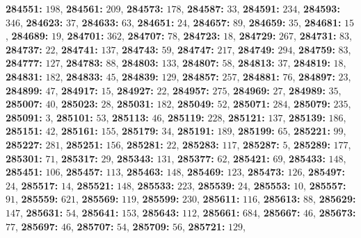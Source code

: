 \textsf{\bfseries 284551:} $198$, \textsf{\bfseries 284561:} $209$, \textsf{\bfseries 284573:} $178$, \textsf{\bfseries 284587:} $33$, \textsf{\bfseries 284591:} $234$, \textsf{\bfseries 284593:} $346$, \textsf{\bfseries 284623:} $37$, \textsf{\bfseries 284633:} $63$, \textsf{\bfseries 284651:} $24$, \textsf{\bfseries 284657:} $89$, \textsf{\bfseries 284659:} $35$, \textsf{\bfseries 284681:} $15$, \textsf{\bfseries 284689:} $19$, \textsf{\bfseries 284701:} $362$, \textsf{\bfseries 284707:} $78$, \textsf{\bfseries 284723:} $18$, \textsf{\bfseries 284729:} $267$, \textsf{\bfseries 284731:} $83$, \textsf{\bfseries 284737:} $22$, \textsf{\bfseries 284741:} $137$, \textsf{\bfseries 284743:} $59$, \textsf{\bfseries 284747:} $217$, \textsf{\bfseries 284749:} $294$, \textsf{\bfseries 284759:} $83$, \textsf{\bfseries 284777:} $127$, \textsf{\bfseries 284783:} $88$, \textsf{\bfseries 284803:} $133$, \textsf{\bfseries 284807:} $58$, \textsf{\bfseries 284813:} $37$, \textsf{\bfseries 284819:} $18$, \textsf{\bfseries 284831:} $182$, \textsf{\bfseries 284833:} $45$, \textsf{\bfseries 284839:} $129$, \textsf{\bfseries 284857:} $257$, \textsf{\bfseries 284881:} $76$, \textsf{\bfseries 284897:} $23$, \textsf{\bfseries 284899:} $47$, \textsf{\bfseries 284917:} $15$, \textsf{\bfseries 284927:} $22$, \textsf{\bfseries 284957:} $275$, \textsf{\bfseries 284969:} $27$, \textsf{\bfseries 284989:} $35$, \textsf{\bfseries 285007:} $40$, \textsf{\bfseries 285023:} $28$, \textsf{\bfseries 285031:} $182$, \textsf{\bfseries 285049:} $52$, \textsf{\bfseries 285071:} $284$, \textsf{\bfseries 285079:} $235$, \textsf{\bfseries 285091:} $3$, \textsf{\bfseries 285101:} $53$, \textsf{\bfseries 285113:} $46$, \textsf{\bfseries 285119:} $228$, \textsf{\bfseries 285121:} $137$, \textsf{\bfseries 285139:} $186$, \textsf{\bfseries 285151:} $42$, \textsf{\bfseries 285161:} $155$, \textsf{\bfseries 285179:} $34$, \textsf{\bfseries 285191:} $189$, \textsf{\bfseries 285199:} $65$, \textsf{\bfseries 285221:} $99$, \textsf{\bfseries 285227:} $281$, \textsf{\bfseries 285251:} $156$, \textsf{\bfseries 285281:} $22$, \textsf{\bfseries 285283:} $117$, \textsf{\bfseries 285287:} $5$, \textsf{\bfseries 285289:} $177$, \textsf{\bfseries 285301:} $71$, \textsf{\bfseries 285317:} $29$, \textsf{\bfseries 285343:} $131$, \textsf{\bfseries 285377:} $62$, \textsf{\bfseries 285421:} $69$, \textsf{\bfseries 285433:} $148$, \textsf{\bfseries 285451:} $106$, \textsf{\bfseries 285457:} $113$, \textsf{\bfseries 285463:} $148$, \textsf{\bfseries 285469:} $123$, \textsf{\bfseries 285473:} $126$, \textsf{\bfseries 285497:} $24$, \textsf{\bfseries 285517:} $14$, \textsf{\bfseries 285521:} $148$, \textsf{\bfseries 285533:} $223$, \textsf{\bfseries 285539:} $24$, \textsf{\bfseries 285553:} $10$, \textsf{\bfseries 285557:} $91$, \textsf{\bfseries 285559:} $621$, \textsf{\bfseries 285569:} $119$, \textsf{\bfseries 285599:} $230$, \textsf{\bfseries 285611:} $116$, \textsf{\bfseries 285613:} $88$, \textsf{\bfseries 285629:} $147$, \textsf{\bfseries 285631:} $54$, \textsf{\bfseries 285641:} $153$, \textsf{\bfseries 285643:} $112$, \textsf{\bfseries 285661:} $684$, \textsf{\bfseries 285667:} $46$, \textsf{\bfseries 285673:} $77$, \textsf{\bfseries 285697:} $46$, \textsf{\bfseries 285707:} $54$, \textsf{\bfseries 285709:} $56$, \textsf{\bfseries 285721:} $129$, 
